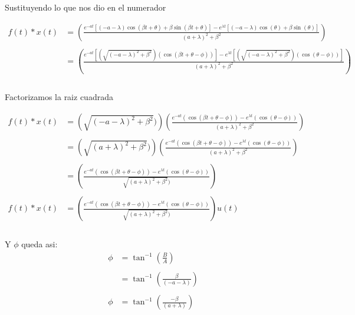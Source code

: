 \documentclass[10pt]{article}
\begin{document}
Sustituyendo lo que nos dio en el numerador

\begin{equation*} 
\begin{split}
f(t)*x(t) & =\left( \frac{e^{-at}[(-a-\lambda)\cos(\beta t + \theta)+\beta\sin(\beta t + \theta)]-e^{\lambda t}[(-a-\lambda)\cos(\theta) + \beta\sin(\theta)]}{(a+\lambda)^{2}+\beta^{2}}\right)\\ \\
 & =\left( \frac{e^{-at}[(\sqrt{(-a-\lambda)^{2}+\beta^{2}})(\cos(\beta t + \theta - \phi))]-e^{\lambda t}[(\sqrt{(-a-\lambda)^{2}+\beta^{2}})(\cos(\theta - \phi))]}{(a+\lambda)^{2}+\beta^{2}}\right)\\ \\
\end{split}
\end{equation*}

\newpage
Factorizamos la raiz cuadrada

\begin{equation*} 
\begin{split}
f(t)*x(t) & =\left(\sqrt{(-a-\lambda)^{2}+\beta^{2}})\right)\left( \frac{e^{-at}(\cos(\beta t + \theta - \phi))-e^{\lambda t}(\cos(\theta - \phi))}{(a+\lambda)^{2}+\beta^{2}}\right)\\ \\
    & =\left(\sqrt{(a+\lambda)^{2}+\beta^{2}})\right)\left( \frac{e^{-at}(\cos(\beta t + \theta - \phi))-e^{\lambda t}(\cos(\theta - \phi))}{(a+\lambda)^{2}+\beta^{2}}\right)\\ \\
    & =\left( \frac{e^{-at}(\cos(\beta t + \theta - \phi))-e^{\lambda t}(\cos(\theta - \phi))}{\sqrt{(a+\lambda)^{2}+\beta^{2}})}\right)\\ \\
 f(t)*x(t)   & =\left( \frac{e^{-at}(\cos(\beta t + \theta - \phi))-e^{\lambda t}(\cos(\theta - \phi))}{\sqrt{(a+\lambda)^{2}+\beta^{2}})}\right)u(t)\\ \\
\end{split}
\end{equation*}

Y $\phi$ queda asi:
\begin{equation*} 
\begin{split}
\phi    & = \tan^{-1}\left(\frac{B}{A}\right)\\ \\
        & = \tan^{-1}\left(\frac{\beta}{(-a-\lambda)}\right)\\ \\
   \phi      & = \tan^{-1}\left(\frac{-\beta}{(a+\lambda)}\right)\\ \\
\end{split}
\end{equation*}
\end{document}
